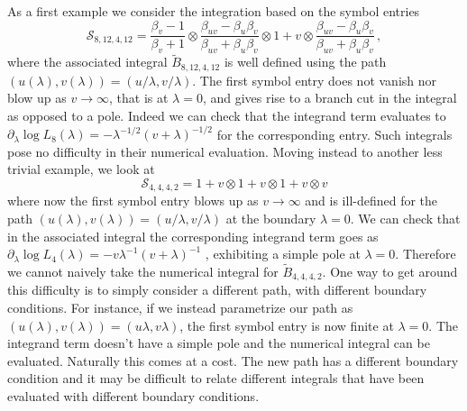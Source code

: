 \documentclass[a4paper,11pt]{article}
\begin{document}
As a first example we consider the integration based on the symbol entries 
\begin{equation}\label{eq:symb_8,12,4,12}
    \mathcal{S}_{8,12,4,12} = \frac{\beta _v-1}{\beta _v+1}\otimes\frac{\beta _{uv}-\beta _u \beta _v}{\beta _{uv}+ \beta _u \beta _v}\otimes 1+v\otimes \frac{\beta _{uv}-\beta _u \beta _v}{\beta _{uv}+\beta _u \beta _v} \,,
\end{equation}
where the associated integral $\tilde{B}_{8,12,4,12}$ is well defined using the path $(u(\lambda), v(\lambda))=(u/\lambda, v/\lambda)$. The first symbol entry does not vanish nor blow up as $v\rightarrow \infty$, that is at $\lambda= 0$, and gives rise to a branch cut in the integral as opposed to a pole. Indeed we can check that the integrand term evaluates to $\partial_\lambda \log L_8(\lambda)= - \lambda^{-1/2} (v+\lambda)^{-1/2}$ for the corresponding entry. Such integrals pose no difficulty in their numerical evaluation. Moving instead to another less trivial example, we look at 
\begin{equation}\label{eq:symb_4,4,4,2}
    \mathcal{S}_{4,4,4,2}= 1+v \otimes 1+v \otimes 1+v \otimes v
\end{equation}
where now the first symbol entry blows up as $v\rightarrow \infty$ and is ill-defined for the path $(u(\lambda), v(\lambda))=(u/\lambda, v/\lambda)$ at the boundary $\lambda=0$. We can check that in the associated integral the corresponding integrand term goes as $\partial_\lambda \log L_4(\lambda) = - v \lambda^{-1} (v+\lambda)^{-1}$ , exhibiting a simple pole at $\lambda=0$. Therefore we cannot naively take the numerical integral for $\tilde{B}_{4,4,4,2}$. One way to get around this difficulty is to simply consider a different path, with different boundary conditions. For instance, if we instead parametrize our path as $(u(\lambda), v(\lambda))=(u \lambda, v \lambda)$, the first symbol entry is now finite at $\lambda = 0$. The integrand term doesn't have a simple pole and the numerical integral can be evaluated. Naturally this comes at a cost. The new path has a different boundary condition and it may be difficult to relate different integrals that have been evaluated with different boundary conditions.
\end{document}

